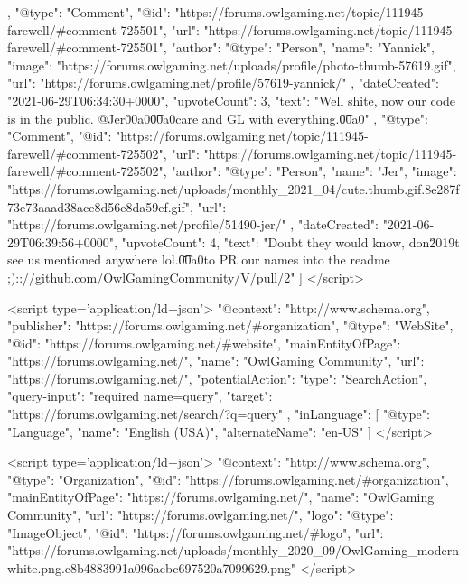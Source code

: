 {{        },
        {
            "@type": "Comment",
            "@id": "https://forums.owlgaming.net/topic/111945-farewell/#comment-725501",
            "url": "https://forums.owlgaming.net/topic/111945-farewell/#comment-725501",
            "author": {
                "@type": "Person",
                "name": "Yannick",
                "image": "https://forums.owlgaming.net/uploads/profile/photo-thumb-57619.gif",
                "url": "https://forums.owlgaming.net/profile/57619-yannick/"
            },
            "dateCreated": "2021-06-29T06:34:30+0000",
            "upvoteCount": 3,
            "text": "Well shite, now our code is in the public. @Jer\u00a0\n \n\n\n\t\u00a0\n \n\n\n\tTake care and GL with everything.\n \n\n\n\t\u00a0\n \n"
        },
        {
            "@type": "Comment",
            "@id": "https://forums.owlgaming.net/topic/111945-farewell/#comment-725502",
            "url": "https://forums.owlgaming.net/topic/111945-farewell/#comment-725502",
            "author": {
                "@type": "Person",
                "name": "Jer",
                "image": "https://forums.owlgaming.net/uploads/monthly_2021_04/cute.thumb.gif.8e287f73e73aaad38ace8d56e8da59ef.gif",
                "url": "https://forums.owlgaming.net/profile/51490-jer/"
            },
            "dateCreated": "2021-06-29T06:39:56+0000",
            "upvoteCount": 4,
            "text": "Doubt they would know, don\u2019t see us mentioned anywhere lol.\n \n\n\n\t\u00a0\n \n\n\n\tTime to PR our names into the readme ;)\n \n\n\n\tupdate:\n \n\n\n\thttps://github.com/OwlGamingCommunity/V/pull/2\n \n"
        }
    ]
}	
</script>

<script type='application/ld+json'>
{
    "@context": "http://www.schema.org",
    "publisher": "https://forums.owlgaming.net/#organization",
    "@type": "WebSite",
    "@id": "https://forums.owlgaming.net/#website",
    "mainEntityOfPage": "https://forums.owlgaming.net/",
    "name": "OwlGaming Community",
    "url": "https://forums.owlgaming.net/",
    "potentialAction": {
        "type": "SearchAction",
        "query-input": "required name=query",
        "target": "https://forums.owlgaming.net/search/?q={query}"
    },
    "inLanguage": [
        {
            "@type": "Language",
            "name": "English (USA)",
            "alternateName": "en-US"
        }
    ]
}	
</script>

<script type='application/ld+json'>
{
    "@context": "http://www.schema.org",
    "@type": "Organization",
    "@id": "https://forums.owlgaming.net/#organization",
    "mainEntityOfPage": "https://forums.owlgaming.net/",
    "name": "OwlGaming Community",
    "url": "https://forums.owlgaming.net/",
    "logo": {
        "@type": "ImageObject",
        "@id": "https://forums.owlgaming.net/#logo",
        "url": "https://forums.owlgaming.net/uploads/monthly_2020_09/OwlGaming_modernwhite.png.c8b4883991a096acbc697520a7099629.png"
    }
}	
</script>

